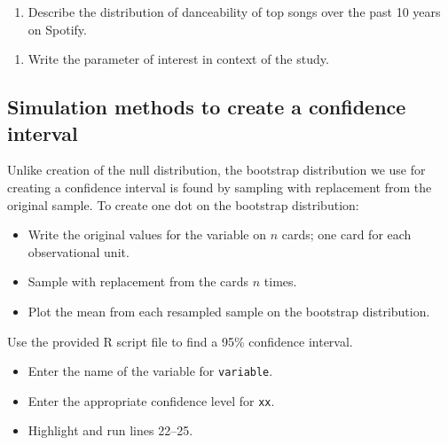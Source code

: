 \documentclass[
]{report}
\newenvironment{Shaded}{\begin{snugshade}}{\end{snugshade}}
\newcommand{\AttributeTok}[1]{\textcolor[rgb]{0.13,0.29,0.53}{#1}}
\newcommand{\CommentTok}[1]{\textcolor[rgb]{0.56,0.35,0.01}{\textit{#1}}}
\newcommand{\DecValTok}[1]{\textcolor[rgb]{0.00,0.00,0.81}{#1}}
\newcommand{\FunctionTok}[1]{\textcolor[rgb]{0.13,0.29,0.53}{\textbf{#1}}}
\newcommand{\NormalTok}[1]{#1}
\newcommand{\SpecialCharTok}[1]{\textcolor[rgb]{0.81,0.36,0.00}{\textbf{#1}}}
\newcommand{\StringTok}[1]{\textcolor[rgb]{0.31,0.60,0.02}{#1}}
\providecommand{\tightlist}{%
  \setlength{\itemsep}{0pt}\setlength{\parskip}{0pt}}
\begin{document}
\begin{enumerate}
\def\labelenumi{\arabic{enumi}.}
\tightlist
\item
  Describe the distribution of danceability of top songs over the past 10 years on Spotify.
\end{enumerate}

\vspace{0.8in}

\begin{enumerate}
\def\labelenumi{\arabic{enumi}.}
\setcounter{enumi}{1}
\tightlist
\item
  Write the parameter of interest in context of the study.
\end{enumerate}

\vspace{0.8in}

\subsection*{Simulation methods to create a confidence interval}\label{simulation-methods-to-create-a-confidence-interval}

Unlike creation of the null distribution, the bootstrap distribution we use for creating a confidence interval is found by sampling with replacement from the original sample. To create one dot on the bootstrap distribution:

\begin{itemize}
\item
  Write the original values for the variable on \(n\) cards; one card for each observational unit.
\item
  Sample with replacement from the cards \(n\) times.
\item
  Plot the mean from each resampled sample on the bootstrap distribution.
\end{itemize}

Use the provided R script file to find a 95\% confidence interval.

\begin{itemize}
\item
  Enter the name of the variable for \texttt{variable}.
\item
  Enter the appropriate confidence level for \texttt{xx}.
\item
  Highlight and run lines 22--25.
\end{itemize}

\begin{Shaded}
\end{Shaded}
\end{document}
